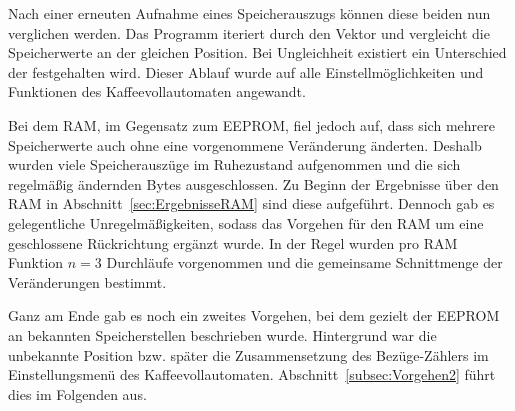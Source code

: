 Nach einer erneuten Aufnahme eines Speicherauszugs können diese beiden nun verglichen werden.
Das Programm iteriert durch den Vektor und vergleicht die Speicherwerte an der gleichen Position.
Bei Ungleichheit existiert ein Unterschied der festgehalten wird.
Dieser Ablauf wurde auf alle Einstellmöglichkeiten und Funktionen des Kaffeevollautomaten angewandt.

Bei dem \ac{RAM}, im Gegensatz zum \ac{EEPROM}, fiel jedoch auf, dass sich mehrere Speicherwerte auch ohne eine vorgenommene Veränderung änderten.
Deshalb wurden viele Speicherauszüge im Ruhezustand aufgenommen und die sich regelmäßig ändernden Bytes ausgeschlossen.
Zu Beginn der Ergebnisse über den \ac{RAM} in Abschnitt~\ref{sec:ErgebnisseRAM} sind diese aufgeführt.
Dennoch gab es gelegentliche Unregelmäßigkeiten, sodass das Vorgehen für den \ac{RAM} um eine geschlossene Rückrichtung ergänzt wurde.
In der Regel wurden pro \ac{RAM} Funktion $n=3$ Durchläufe vorgenommen und die gemeinsame Schnittmenge der Veränderungen bestimmt.

Ganz am Ende gab es noch ein zweites Vorgehen, bei dem gezielt der \ac{EEPROM} an bekannten Speicherstellen beschrieben wurde.
Hintergrund war die unbekannte Position bzw. später die Zusammensetzung des Bezüge-Zählers im Einstellungsmenü des Kaffeevollautomaten.
Abschnitt~\ref{subsec:Vorgehen2} führt dies im Folgenden aus.

